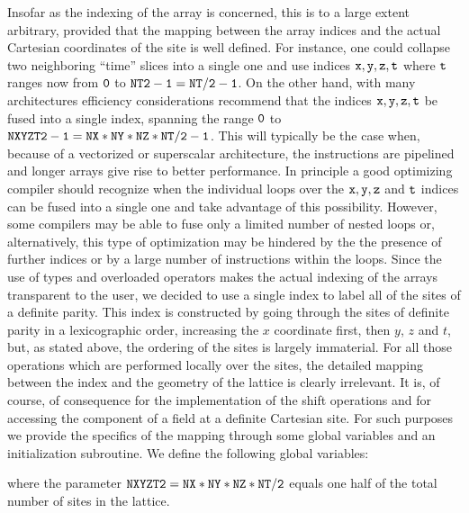 Insofar as the indexing of the array is concerned, this is to a large
extent arbitrary, provided that the mapping between the array indices
and the actual Cartesian coordinates of the site is well defined.
For instance, one could collapse two neighboring ``time'' slices
into a single one and use indices $\tt x,y,z,t$ where $\tt t$ ranges
now from $\tt 0$ to $\tt NT2-1=NT/2-1$.  On the other hand,
with many architectures efficiency considerations recommend that 
the indices $\tt x,y,z,t$ be fused into a single index,
spanning the range $\tt 0$ to $\tt NXYZT2-1=NX*NY*NZ*NT/2-1$.
This will typically be the case when, because of a vectorized or
superscalar architecture, the instructions are pipelined and
longer arrays give rise to better performance.  In principle
a good optimizing compiler should recognize when the individual 
loops over the $\tt x,y,z$ and $\tt t$ indices can be fused
into a single one and take advantage of this possibility.  However,
some compilers may be able to fuse only a limited number of nested loops
or, alternatively, this type of optimization may be hindered by the
the presence of further indices or by a large number of instructions
within the loops.  Since the use of types and overloaded
operators makes the actual indexing of the arrays transparent
to the user, we decided to use a single index to label all of
the sites of a definite parity.  This index is constructed by
going through the sites of definite parity in a lexicographic
order, increasing the $x$ coordinate first, then $y$, $z$ and $t$,
but, as stated above, the ordering of the sites is largely immaterial.
For all those operations which are performed locally over the sites,
the detailed mapping between the index and the geometry of the lattice
is clearly irrelevant.  It is, of course, of consequence for
the implementation of the shift operations and for accessing
the component of a field at a definite Cartesian site.
For such purposes we provide the specifics of the mapping through
some global variables and an initialization subroutine.
We define the following global variables:

{}
{}
{}
{}
{}

{\parindent=0pt where the parameter $\tt NXYZT2=NX*NY*NZ*NT/2$ 
equals one half of the total number of sites in the lattice.}

